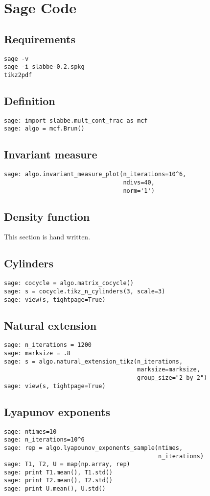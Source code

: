 \section{Sage Code}
\begin{refsegment}
\subsection{Requirements}
\begin{verbatim}
sage -v
sage -i slabbe-0.2.spkg
tikz2pdf
\end{verbatim}
\subsection{Definition}
\begin{verbatim}
sage: import slabbe.mult_cont_frac as mcf
sage: algo = mcf.Brun()
\end{verbatim}
\subsection{Invariant measure}
\begin{verbatim}
sage: algo.invariant_measure_plot(n_iterations=10^6,
                                  ndivs=40,
                                  norm='1')
\end{verbatim}
\subsection{Density function}
This section is hand written.
\subsection{Cylinders}
\begin{verbatim}
sage: cocycle = algo.matrix_cocycle()
sage: s = cocycle.tikz_n_cylinders(3, scale=3)
sage: view(s, tightpage=True)
\end{verbatim}
\subsection{Natural extension}
\begin{verbatim}
sage: n_iterations = 1200
sage: marksize = .8
sage: s = algo.natural_extension_tikz(n_iterations, 
                                      marksize=marksize,
                                      group_size="2 by 2")
sage: view(s, tightpage=True)
\end{verbatim}
\subsection{Lyapunov exponents}
\begin{verbatim}
sage: ntimes=10 
sage: n_iterations=10^6
sage: rep = algo.lyapounov_exponents_sample(ntimes, 
                                            n_iterations)
sage: T1, T2, U = map(np.array, rep)
sage: print T1.mean(), T1.std()
sage: print T2.mean(), T2.std()
sage: print U.mean(), U.std()
\end{verbatim}

\end{refsegment}
